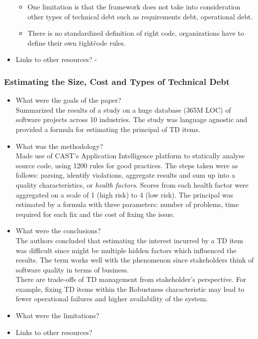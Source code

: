 \documentclass{mprop}
\begin{document}
\begin{itemize}
\begin{itemize}
		      \item One limitation is that the framework does not take into consideration other types of technical debt such as requirements debt, operational debt.
		      \item There is no standardized definition of right code, organizations have to define their own \"right\" code rules.
	      \end{itemize}
	\item Links to other resources?
	      -
\end{itemize}

\subsubsection{Estimating the Size, Cost and Types of Technical Debt} \cite{Curtis2012}
\begin{itemize}
	\item What were the goals of the paper? \\
	      Summarized the results of a study on a huge database (365M LOC) of software projects across 10 industries.
	      The study was language agnostic and provided a formula for estimating the principal of TD items.
	\item What was the methodology? \\
	      Made use of CAST's Application Intelligence platform to statically analyse source code, using 1200 rules for good practices.
	      The steps taken were as follows: parsing, identify violations, aggregate results and sum up into a quality characteristics, or \textit{health factors}.
	      Scores from each health factor were aggregated on a scale of 1 (high risk) to 4 (low risk).
	      The principal was estimated by a formula with three parameters: number of problems, time required for each fix and the cost of fixing the issue.
	\item What were the conclusions? \\
	      The authors concluded that estimating the interest incurred by a TD item was difficult since might be multiple hidden factors which influenced the results.
	      The term works well with the phenomenon since stakeholders think of software quality in terms of business. \\
	      There are trade-offs of TD management from stakeholder's perspective.
	      For example, fixing TD items within the Robustness characteristic may lead to fewer operational failures and higher availability of the system.
	\item What were the limitations? \\
	\item Links to other resources? \\
\end{itemize}
\end{document}
